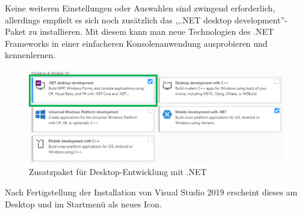 Keine weiteren Einstellungen oder Auswahlen sind zwingend erforderlich, allerdings empfielt es sich noch zusätzlich das ,,.NET desktop development''-Paket zu installieren.
Mit diesem kann man neue Technologien des .NET Frameworks in einer einfacheren Konsolenanwendung ausprobieren und kennenlernen.
\begin{figure}[H]
    \centering\includegraphics[width=0.9\linewidth]{images/auswahl_rahmenwerk/installation2.png}    
    \caption{Zusatzpaket für Desktop-Entwicklung mit .NET}
\end{figure}
Nach Fertigstellung der Installation von Visual Studio 2019 erscheint dieses am Desktop und im Startmenü als neues Icon.

